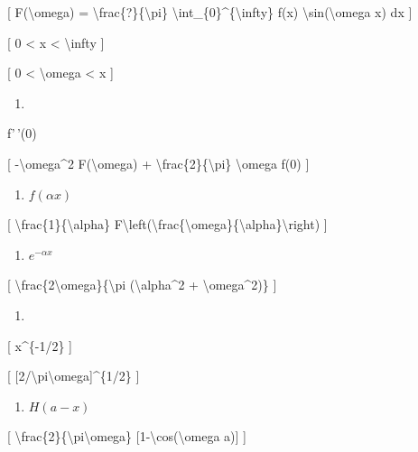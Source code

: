 \documentclass[
]{article}
\providecommand{\tightlist}{%
  \setlength{\itemsep}{0pt}\setlength{\parskip}{0pt}}
\begin{document}
{{[} F(\textbackslash omega) =
\textbackslash frac\{?\}\{\textbackslash pi\}
\textbackslash int\_\{0\}\^{}\{\textbackslash infty\} f(x)
\textbackslash sin(\textbackslash omega x) dx {]}

{[} 0 \textless{} x \textless{} \textbackslash infty {]}

{[} 0 \textless{} \textbackslash omega \textless{} x {]}

\begin{enumerate}
\def\labelenumi{\arabic{enumi}.}
\tightlist
\item
\end{enumerate}

f'\,'(0)

{[} -\textbackslash omega\^{}2 F(\textbackslash omega) +
\textbackslash frac\{2\}\{\textbackslash pi\} \textbackslash omega f(0)
{]}

\begin{enumerate}
\def\labelenumi{\arabic{enumi}.}
\setcounter{enumi}{1}
\tightlist
\item
  \(f(\alpha x)\)
\end{enumerate}

{[} \textbackslash frac\{1\}\{\textbackslash alpha\}
F\textbackslash left(\textbackslash frac\{\textbackslash omega\}\{\textbackslash alpha\}\textbackslash right)
{]}

\begin{enumerate}
\def\labelenumi{\arabic{enumi}.}
\setcounter{enumi}{2}
\tightlist
\item
  \(e^{-\alpha x}\)
\end{enumerate}

{[} \textbackslash frac\{2\textbackslash omega\}\{\textbackslash pi
(\textbackslash alpha\^{}2 + \textbackslash omega\^{}2)\} {]}

\begin{enumerate}
\def\labelenumi{\arabic{enumi}.}
\setcounter{enumi}{3}
\tightlist
\item
\end{enumerate}

{[} x\^{}\{-1/2\} {]}

{[} {[}2/\textbackslash pi\textbackslash omega{]}\^{}\{1/2\} {]}

\begin{enumerate}
\def\labelenumi{\arabic{enumi}.}
\setcounter{enumi}{4}
\tightlist
\item
  \(H(a-x)\)
\end{enumerate}

{[} \textbackslash frac\{2\}\{\textbackslash pi\textbackslash omega\}
{[}1-\textbackslash cos(\textbackslash omega a){]} {]}

}
\end{document}
